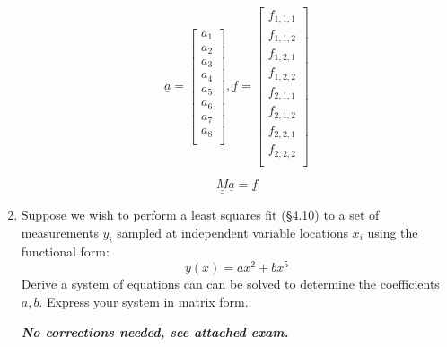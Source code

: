 \documentclass{article}
\begin{document}
\begin{enumerate}
    $$\underline{a} = \begin{bmatrix}
    a_1 \\
    a_2 \\
    a_3 \\
    a_4 \\
    a_5 \\
    a_6 \\
    a_7 \\
    a_8 \\
    \end{bmatrix} , \underline{f} = \begin{bmatrix}
    f_{1,1,1} \\
    f_{1,1,2} \\
    f_{1,2,1} \\
    f_{1,2,2} \\
    f_{2,1,1} \\
    f_{2,1,2} \\
    f_{2,2,1} \\
    f_{2,2,2} \\
    \end{bmatrix}$$
    
    $$\underline{\underline{M}} \underline{a} = \underline{f}$$
    
    \pagebreak
    
   \item Suppose we wish to perform a least squares fit (\S 4.10) to a set of measurements $y_i$ sampled at independent variable locations $x_i$ using the functional form:  
    \begin{equation}
      y(x) = a x^2 + b x^5
    \end{equation}
    Derive a system of equations can can be solved to determine the coefficients $a,b$.  Express your system in matrix form.  
     
    \bigskip
    
    \bigskip
    
    \textbf{\emph{No corrections needed, see attached exam.}}
    
\end{enumerate}
\end{document}
